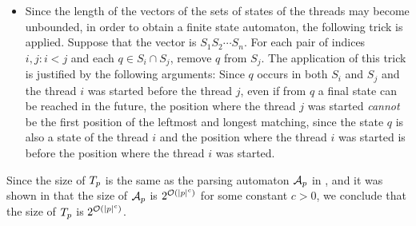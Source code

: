 \begin{itemize}
%
%
	\item Since the length of the vectors of the sets of states of the threads may become unbounded, in order to obtain a finite state automaton, the following trick is applied.
    Suppose that the vector is $S_1 S_2 \cdots S_n$.
    For each pair of indices $i, j: i < j$ and each $q \in S_i \cap S_j$, remove $q$ from $S_j$.
    The application of this trick is justified by the following arguments: Since $q$ occurs in both $S_i$ and $S_j$ and the thread $i$ was started before the thread $j$, even if from $q$  a final state can be reached in the future, the position where the thread $j$ was started \emph{cannot} be the first position of the leftmost and longest matching, since the state $q$ is also a state of the thread $i$ and the position where the thread $i$ was started is before the position where the thread $i$ was started.
\end{itemize}

Since the size of $T_p$ is the same as the parsing automaton $\mathcal{A}_p$ in \cite{CCHLW18}, and it was shown in  \cite{CCHLW18} that the size of $\mathcal{A}_p$ is $2^{\mathcal{O}(|p|^c)}$ for some constant $c > 0$, we conclude that the size of $T_p$ is $2^{\mathcal{O}(|p|^c)}$.

